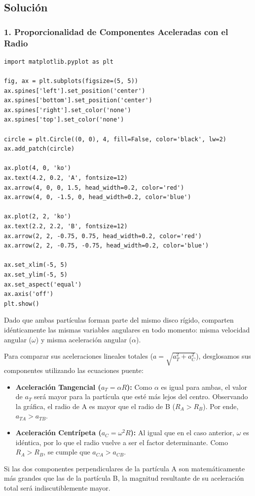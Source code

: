 \documentclass[12pt, a4paper]{article}
\begin{document}
\subsection*{Solución}

\subsubsection*{1. Proporcionalidad de Componentes Aceleradas con el Radio}

\begin{verbatim}
import matplotlib.pyplot as plt

fig, ax = plt.subplots(figsize=(5, 5))
ax.spines['left'].set_position('center')
ax.spines['bottom'].set_position('center')
ax.spines['right'].set_color('none')
ax.spines['top'].set_color('none')

circle = plt.Circle((0, 0), 4, fill=False, color='black', lw=2)
ax.add_patch(circle)

ax.plot(4, 0, 'ko')
ax.text(4.2, 0.2, 'A', fontsize=12)
ax.arrow(4, 0, 0, 1.5, head_width=0.2, color='red')
ax.arrow(4, 0, -1.5, 0, head_width=0.2, color='blue')

ax.plot(2, 2, 'ko')
ax.text(2.2, 2.2, 'B', fontsize=12)
ax.arrow(2, 2, -0.75, 0.75, head_width=0.2, color='red')
ax.arrow(2, 2, -0.75, -0.75, head_width=0.2, color='blue')

ax.set_xlim(-5, 5)
ax.set_ylim(-5, 5)
ax.set_aspect('equal')
ax.axis('off')
plt.show()
\end{verbatim}

Dado que ambas partículas forman parte del mismo disco rígido, comparten idénticamente las mismas variables angulares en todo momento: misma velocidad angular ($\omega$) y misma aceleración angular ($\alpha$).

Para comparar sus aceleraciones lineales totales ($a = \sqrt{a_T^2 + a_C^2}$), desglosamos sus componentes utilizando las ecuaciones puente:
\begin{itemize}
    \item \textbf{Aceleración Tangencial ($a_T = \alpha R$):} Como $\alpha$ es igual para ambas, el valor de $a_T$ será mayor para la partícula que esté más lejos del centro. Observando la gráfica, el radio de A es mayor que el radio de B ($R_A > R_B$). Por ende, $a_{TA} > a_{TB}$.
    \item \textbf{Aceleración Centrípeta ($a_C = \omega^2 R$):} Al igual que en el caso anterior, $\omega$ es idéntica, por lo que el radio vuelve a ser el factor determinante. Como $R_A > R_B$, se cumple que $a_{CA} > a_{CB}$.
\end{itemize}
Si las dos componentes perpendiculares de la partícula A son matemáticamente más grandes que las de la partícula B, la magnitud resultante de su aceleración total será indiscutiblemente mayor. 
\end{document}
